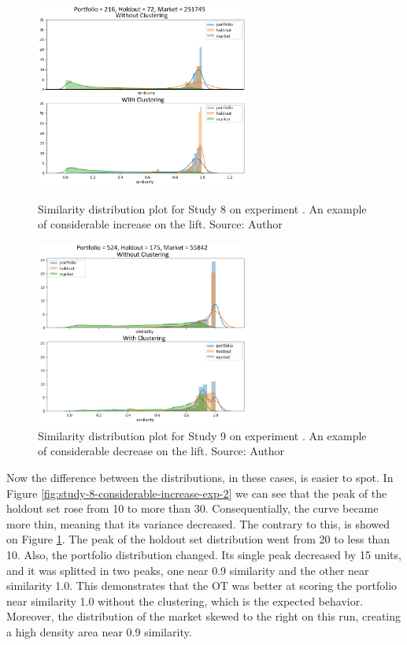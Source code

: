 \begin{figure}[h]
   \centering
   \includegraphics[width=7cm]{fig/ch4-study-8-considerable-increase-exp-2.png}
   \caption{Similarity distribution plot for Study 8 on experiment \nameExperimentII{}. An example of considerable increase on the lift. Source: Author}
   \label{fig:study-8-considerable-increase-exp-2}

   \includegraphics[width=7cm]{fig/ch4-study-9-considerable-decrease-exp-1.png}
   \caption{Similarity distribution plot for Study 9 on experiment \nameExperimentI{}. An example of considerable decrease on the lift. Source: Author}
   \label{fig:study-9-considerable-decrease-exp-1}
\end{figure}

Now the difference between the distributions, in these cases, is easier to spot. In Figure \ref{fig:study-8-considerable-increase-exp-2} we can see that the peak of the holdout set rose from 10 to more than 30. Consequentially, the curve became more thin, meaning that its variance decreased. The contrary to this, is showed on Figure \ref{fig:study-9-considerable-decrease-exp-1}. The peak of the holdout set distribution went from 20 to less than 10. Also, the portfolio distribution changed. Its single peak decreased by 15 units, and it was splitted in two peaks, one near 0.9 similarity and the other near similarity 1.0. This demonstrates that the OT was better at scoring the portfolio near similarity 1.0 without the clustering, which is the expected behavior. Moreover, the distribution of the market skewed to the right on this run, creating a high density area near 0.9 similarity. 

